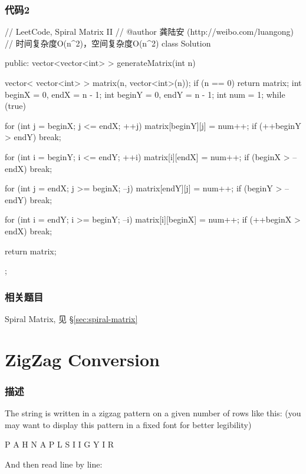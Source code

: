 \subsubsection{代码2}
\begin{Code}
// LeetCode, Spiral Matrix II
// @author 龚陆安 (http://weibo.com/luangong)
// 时间复杂度O(n^2)，空间复杂度O(n^2)
class Solution {
public:
    vector<vector<int> > generateMatrix(int n) {
        vector< vector<int> > matrix(n, vector<int>(n));
        if (n == 0) return matrix;
        int beginX = 0, endX = n - 1;
        int beginY = 0, endY = n - 1;
        int num = 1;
        while (true) {
            for (int j = beginX; j <= endX; ++j) matrix[beginY][j] = num++;
            if (++beginY > endY) break;

            for (int i = beginY; i <= endY; ++i) matrix[i][endX] = num++;
            if (beginX > --endX) break;

            for (int j = endX; j >= beginX; --j) matrix[endY][j] = num++;
            if (beginY > --endY) break;

            for (int i = endY; i >= beginY; --i) matrix[i][beginX] = num++;
            if (++beginX > endX) break;
        }
        return matrix;
    }
};
\end{Code}


\subsubsection{相关题目}
\begindot
\item Spiral Matrix, 见 \S \ref{sec:spiral-matrix}
\myenddot


\section{ZigZag Conversion} %
\label{sec:zigzag-conversion}


\subsubsection{描述}
The string  is written in a zigzag pattern on a given number of rows like this: (you may want to display this pattern in a fixed font for better legibility)

\begin{Code}
P   A   H   N
A P L S I I G
Y   I   R
\end{Code}

And then read line by line: 

